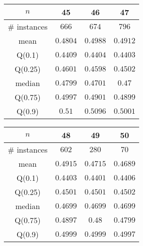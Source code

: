 \begin{tabular}{c|ccc} 
\hline 
$n$ & 45 & 46 & 47 \tabularnewline 
\hline 
\hline 
\# instances & $666$ & $674$ & $796$ \tabularnewline 
mean & $0.4804$ & $0.4988$ & $0.4912$ \tabularnewline 
Q(0.1) & $0.4409$ & $0.4404$ & $0.4403$ \tabularnewline 
Q(0.25) & $0.4601$ & $0.4598$ & $0.4502$ \tabularnewline 
median & $0.4799$ & $0.4701$ & $0.47$ \tabularnewline 
Q(0.75) & $0.4997$ & $0.4901$ & $0.4899$ \tabularnewline 
Q(0.9) & $0.51$ & $0.5096$ & $0.5001$ \tabularnewline 
\hline 
\end{tabular} 
\medskip{} 

\begin{tabular}{c|ccc} 
\hline 
$n$ & 48 & 49 & 50 \tabularnewline 
\hline 
\hline 
\# instances & $602$ & $280$ & $70$ \tabularnewline 
mean & $0.4915$ & $0.4715$ & $0.4689$ \tabularnewline 
Q(0.1) & $0.4403$ & $0.4401$ & $0.4406$ \tabularnewline 
Q(0.25) & $0.4501$ & $0.4501$ & $0.4502$ \tabularnewline 
median & $0.4699$ & $0.4699$ & $0.4699$ \tabularnewline 
Q(0.75) & $0.4897$ & $0.48$ & $0.4799$ \tabularnewline 
Q(0.9) & $0.4999$ & $0.4999$ & $0.4997$ \tabularnewline 
\hline 
\end{tabular} 
\medskip{} 

